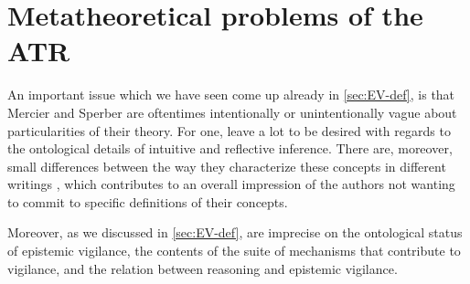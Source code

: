 \section{Metatheoretical problems of the ATR}
\label{sec:ont-atr}

An important issue which we have seen come up already in \cref{sec:EV-def}, is that Mercier and Sperber are oftentimes intentionally or unintentionally vague about particularities of their theory.
For one, \citet{MS09} leave a lot to be desired with regards to the ontological details of intuitive and reflective inference.
There are, moreover, small differences between the way they characterize these concepts in different writings \citep{MS09, MS11, MS17}, which contributes to an overall impression of the authors not wanting to commit to specific definitions of their concepts.

Moreover, as we discussed in \cref{sec:EV-def}, \citet{Sperber10} are imprecise on the ontological status of epistemic vigilance, the contents of the suite of mechanisms that contribute to vigilance, and the relation between reasoning and epistemic vigilance.


